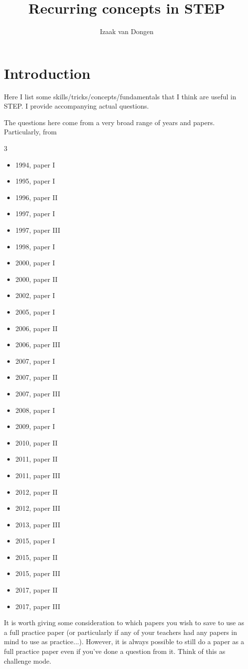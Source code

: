 \documentclass[a4paper,12pt]{article}
\author{Izaak van Dongen}
\title{Recurring concepts in STEP}
\begin{document}
\maketitle
\tableofcontents


\section{Introduction}

Here I list some skills/tricks/concepts/fundamentals that I think are useful in
STEP. I provide accompanying actual questions.

The questions here come from a very broad range of years and papers.
Particularly, from
\begin{multicols}3
 \begin{itemize}
  \item 1994, paper I
  \item 1995, paper I
  \item 1996, paper II
  \item 1997, paper I
  \item 1997, paper III
  \item 1998, paper I
  \item 2000, paper I
  \item 2000, paper II
  \item 2002, paper I
  \item 2005, paper I
  \item 2006, paper II
  \item 2006, paper III
  \item 2007, paper I
  \item 2007, paper II
  \item 2007, paper III
  \item 2008, paper I
  \item 2009, paper I
  \item 2010, paper II
  \item 2011, paper II
  \item 2011, paper III
  \item 2012, paper II
  \item 2012, paper III
  \item 2013, paper III
  \item 2015, paper I
  \item 2015, paper II
  \item 2015, paper III
  \item 2017, paper II
  \item 2017, paper III
 \end{itemize}
\end{multicols}
It is worth giving some consideration to which papers you wish to save to use as
a full practice paper (or particularly if any of your teachers had any papers in
mind to use as practice...). However, it is always possible to still do a paper
as a full practice paper even if you've done a question from it. Think of this
as challenge mode.
\end{document}
